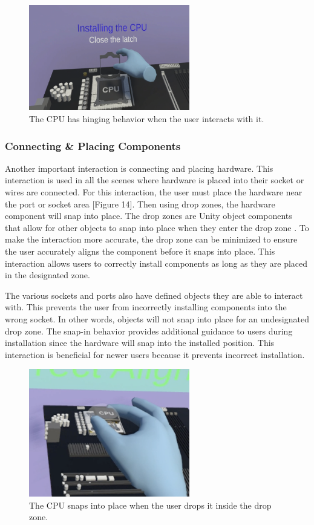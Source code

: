 \documentclass[10pt,twocolumn]{article}
\begin{document}
\begin{figure}
    \centering
    \includegraphics[width=7cm]{images/CPUHinge.png}
    \caption{The CPU has hinging behavior when the user interacts with it.}
\end{figure}

\subsubsection{Connecting \& Placing Components}

\par Another important interaction is connecting and placing hardware. This interaction is used in all the scenes where hardware is placed into their socket or wires are connected. For this interaction, the user must place the hardware near the port or socket area [Figure 14]. Then using drop zones, the hardware component will snap into place. The drop zones are Unity object components that allow for other objects to snap into place when they enter the drop zone \cite{Unity2023VRSnapZones}. To make the interaction more accurate, the drop zone can be minimized to ensure the user accurately aligns the component before it snaps into place. This interaction allows users to correctly install components as long as they are placed in the designated zone. 

\par The various sockets and ports also have defined objects they are able to interact with. This prevents the user from incorrectly installing components into the wrong socket. In other words, objects will not snap into place for an undesignated drop zone. The snap-in behavior provides additional guidance to users during installation since the hardware will snap into the installed position. This interaction is beneficial for newer users because it prevents incorrect installation. 

\begin{figure}
    \centering
    \includegraphics[width=7cm]{images/DropZone.png}
    \caption{The CPU snaps into place when the user drops it inside the drop zone.}
\end{figure}
\end{document}
